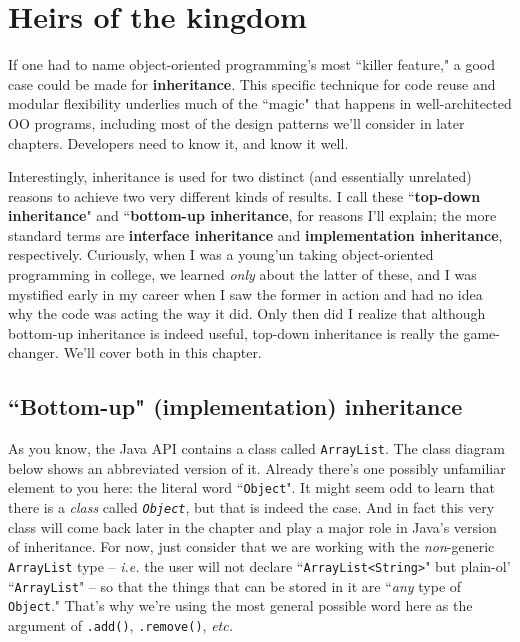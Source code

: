 
\chapter{Heirs of the kingdom}

If one had to name object-oriented programming's most ``killer feature," a
good case could be made for \textbf{inheritance}. This specific technique for
code reuse and modular flexibility underlies much of the ``magic" that happens
in well-architected OO programs, including most of the design patterns we'll
consider in later chapters. Developers need to know it, and know it well.

Interestingly, inheritance is used for two distinct (and essentially
unrelated) reasons to achieve two very different kinds of results. I call
these ``\textbf{top-down inheritance}" and ``\textbf{bottom-up inheritance},
for reasons I'll explain; the more standard terms are \textbf{interface
inheritance} and \textbf{implementation inheritance}, respectively. Curiously,
when I was a young'un taking object-oriented programming in college, we
learned \textit{only} about the latter of these, and I was mystified early in
my career when I saw the former in action and had no idea why the code was
acting the way it did. Only then did I realize that although bottom-up
inheritance is indeed useful, top-down inheritance is really the game-changer.
We'll cover both in this chapter.

\section{``Bottom-up" (implementation) inheritance}

As you know, the Java API contains a class called \texttt{ArrayList}. The
class diagram below shows an abbreviated version of it. Already there's one
possibly unfamiliar element to you here: the literal word ``\texttt{Object}".
It might seem odd to learn that there is a \textit{class} called
\textit{\texttt{Object}}, but that is indeed the case. And in fact this very
class will come back later in the chapter and play a major role in Java's
version of inheritance. For now, just consider that we are working with the
\textit{non}-generic \texttt{ArrayList} type -- \textit{i.e.} the user will
not declare ``\texttt{ArrayList<String>}" but plain-ol' ``\texttt{ArrayList}"
-- so that the things that can be stored in it are ``\textit{any} type of
\texttt{Object}." That's why we're using the most general possible word here
as the argument of \texttt{.add()}, \texttt{.remove()}, \textit{etc.}


